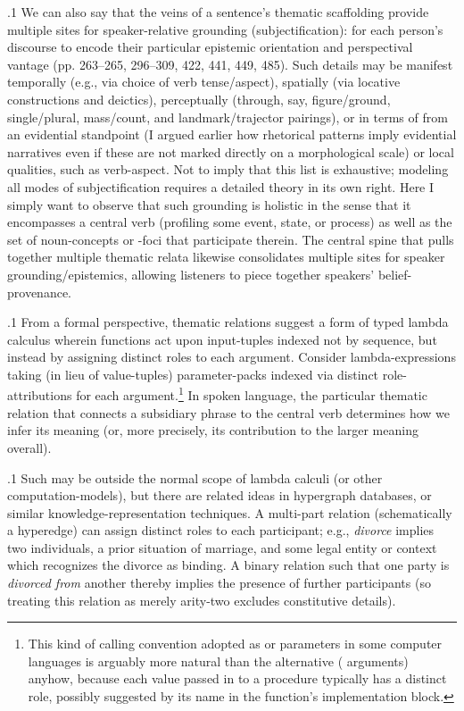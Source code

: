\documentclass[11pt, twocolumn]{article}
\begin{document}
\p.1{%
\:\+We can also say that the veins of a sentence's thematic scaffolding
provide multiple sites for speaker-relative grounding
(subjectification): for
each person's discourse to encode their particular epistemic
orientation and perspectival vantage (pp. 263--265, 296--309, 422, 
441, 449, 485). \> Such details may
be manifest temporally (e.g., via choice of verb tense/aspect),
spatially (via locative constructions and deictics), perceptually
(through, say, figure/ground, single/plural,
mass/count, and landmark/\allowbreak{}trajector pairings),
or in terms of  from an evidential
standpoint (I argued earlier how rhetorical patterns
imply evidential narratives even if these are not marked
directly on a morphological scale) or local qualities, such as
verb-aspect. \> Not to imply that this list is exhaustive;
modeling all modes of subjectification requires a detailed
theory in its own right. \> Here I simply want to observe that
such grounding is holistic in the sense that it encompasses
a central verb (profiling some event, state,
or process) as well as
the set of noun-concepts or -foci that participate 
therein. \> The central spine that pulls together multiple thematic
relata likewise consolidates multiple sites for speaker
grounding/epistemics, allowing listeners to piece together
speakers' belief-provenance.\<\;
} %

\p.1{%
\:\+From a formal perspective, thematic relations suggest a
form of typed lambda calculus wherein functions act upon
input-tuples indexed not by sequence, but instead by
assigning distinct roles to each argument. \> Consider 
lambda-expressions taking (in lieu of
value-tuples) parameter-packs indexed via
distinct role-attributions for each argument.\<\footnote{
\label{fn:cc} \+This kind of calling convention
\mdash{} adopted as  or  parameters
in some computer languages \mdash{} is arguably
more natural than the alternative (
arguments) anyhow, because each value passed in to a procedure
typically has a distinct role, possibly suggested by its
name in the function's implementation
block.\<}  \+In spoken language, the particular
thematic relation that connects a subsidiary phrase to the
central verb determines how we infer its meaning
(or, more precisely, its contribution to the larger meaning 
overall).\<\;
} %

\p.1{%
\:\+Such  may be outside the normal
scope of lambda calculi (or other computation-models), but there are
related ideas in
hypergraph databases, or similar knowledge-representation 
techniques. \> A multi-part relation (schematically a hyperedge) can assign distinct roles
to each participant; e.g., \textit{divorce} implies two individuals,
a prior situation of marriage, and some legal entity or
context which recognizes the divorce as binding. \> A 
binary relation such that one party is \textit{divorced from}
another thereby implies the presence of further participants
(so treating this relation as merely arity-two excludes constitutive
details).\<\;
} %
\end{document}
